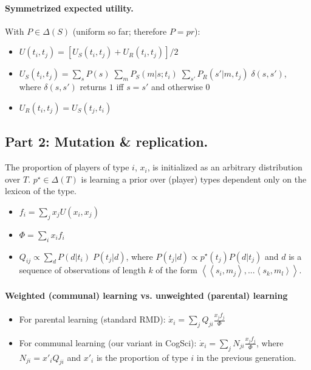 \documentclass[11pt]{article}
\newcommand{\tuple}[1]{\ensuremath{\left\langle #1 \right\rangle}}
\begin{document}
\paragraph{Symmetrized expected utility.} With $P \in \Delta(S)$ (uniform so far; therefore $P = pr$):
\begin{itemize}

  \item $U(t_i,t_j) = [U_S(t_i,t_j) + U_R(t_i,t_j)] / 2$
  \item $U_S(t_i,t_j) = \sum_s P(s) \; \sum_m P_S(m|s;t_i) \; \sum_{s'} P_R(s'|m,t_j) \; \delta(s,s')$, where $\delta(s,s')$ returns $1$ iff $s = s'$ and otherwise $0$
  \item $U_R(t_i,t_j) = U_S(t_j,t_i)$
\end{itemize}


\subsection{Part 2: Mutation \& replication.}
The proportion of players of type $i$, $x_i$, is initialized as an arbitrary distribution over $T$. $p^\star \in \Delta(T)$ is learning a prior over (player) types dependent only on the lexicon of the type. 
\begin{itemize}
    \item $f_i = \sum_j x_j U(x_i,x_j)$
    \item $\Phi = \sum_i x_i f_i$
    \item $Q_{ij} \propto \sum_d P(d|t_i) \; P(t_j|d)$, where $P(t_j|d) \propto p^\star(t_j) P(d|t_j)$ and $d$ is a sequence of observations of length $k$ of the form \tuple{\tuple{s_i,m_j}, ... \tuple{s_k, m_l}}.
\end{itemize}

\paragraph{Weighted (communal) learning vs. unweighted (parental) learning}

\begin{itemize}
	\item For parental learning (standard RMD): $\dot x_i = \sum_j Q_{ji} \frac{x_j f_j}{\Phi}$
	\item For communal learning (our variant in CogSci): $\dot x_i = \sum_j N_{ji} \frac{x_j f_j}{\Phi}$, where $N_{ji} = x'_{i} Q_{ji}$ and $x'_i$ is the proportion of type $i$ in the previous generation.
\end{itemize}
\end{document}
